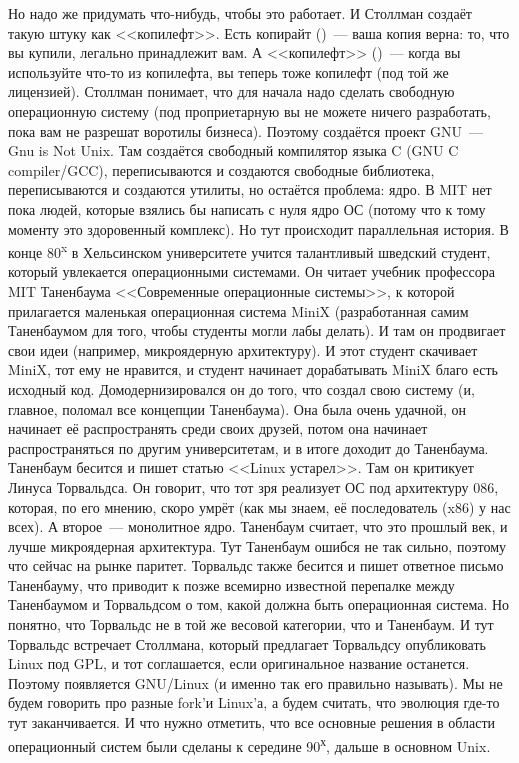 \documentclass{article}
\begin{document}
    Но надо же придумать что-нибудь, чтобы это работает. И Столлман создаёт такую штуку как <<копилефт>>. Есть копирайт (\textcopyright)~--- ваша копия верна: то, что вы купили, легально принадлежит вам. А <<копилефт>> (\textcopyleft)~--- когда вы используйте что-то из копилефта, вы теперь тоже копилефт (под той же лицензией). Столлман понимает, что для начала надо сделать свободную операционную систему (под проприетарную вы не можете ничего разработать, пока вам не разрешат воротилы бизнеса). Поэтому создаётся проект GNU~--- Gnu is Not Unix. Там создаётся свободный компилятор языка C (GNU C compiler/GCC), переписываются и создаются свободные библиотека, переписываются и создаются утилиты, но остаётся проблема: ядро. В MIT нет пока людей, которые взялись бы написать с нуля ядро ОС (потому что к тому моменту это здоровенный комплекс). Но тут происходит параллельная история. В конце 80\textsuperscript{x} в Хельсинском университете учится талантливый шведский студент, который увлекается операционными системами. Он читает учебник профессора MIT Таненбаума <<Современные операционные системы>>, к которой прилагается маленькая операционная система MiniX (разработанная самим Таненбаумом для того, чтобы студенты могли лабы делать). И там он продвигает свои идеи (например, микроядерную архитектуру). И этот студент скачивает MiniX, тот ему не нравится, и студент начинает дорабатывать MiniX благо есть исходный код. Домодернизировался он до того, что создал свою систему (и, главное, поломал все концепции Таненбаума). Она была очень удачной, он начинает её распространять среди своих друзей, потом она начинает распространяться по другим университетам, и в итоге доходит до Таненбаума. Таненбаум бесится и пишет статью <<Linux устарел>>. Там он критикует Линуса Торвальдса. Он говорит, что тот зря реализует ОС под архитектуру 086, которая, по его мнению, скоро умрёт (как мы знаем, её последователь (x86) у нас всех). А второе~--- монолитное ядро. Таненбаум считает, что это прошлый век, и лучше микроядерная архитектура. Тут Таненбаум ошибся не так сильно, поэтому что сейчас на рынке паритет. Торвальдс также бесится и пишет ответное письмо Таненбауму, что приводит к позже всемирно известной перепалке между Таненбаумом и Торвальдсом о том, какой должна быть операционная система. Но понятно, что Торвальдс не в той же весовой категории, что и Таненбаум. И тут Торвальдс встречает Столлмана, который предлагает Торвальдсу опубликовать Linux под GPL, и тот соглашается, если оригинальное название останется. Поэтому появляется GNU/Linux (и именно так его правильно называть). Мы не будем говорить про разные fork'и Linux'а, а будем считать, что эволюция где-то тут заканчивается. И что нужно отметить, что все основные решения в области операционный систем были сделаны к середине 90\textsuperscript{х}, дальше в основном Unix.
    
\end{document}
